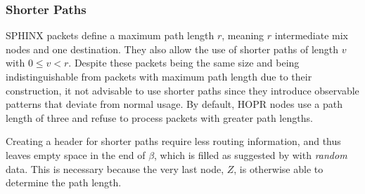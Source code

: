 \subsubsection{Shorter Paths}
\label{sec:sphinx:shorterpaths}

SPHINX packets define a maximum path length $r$, meaning $r$ intermediate mix nodes and one destination. They also allow the use of shorter paths of length $v$ with $0 \le v < r$. Despite these packets being the same size and being indistinguishable from packets with maximum path length due to their construction, it not advisable to use shorter paths since they introduce observable patterns that deviate from normal usage. By default, HOPR nodes use a path length of three and refuse to process packets with greater path lengths. 

Creating a header for shorter paths require less routing information, and thus leaves empty space in the end of $\beta$, which is filled as suggested by \cite{sphinxpaperfix} with \textit{random} data. This is necessary because the very last node, $Z$, is otherwise able to determine the path length.

